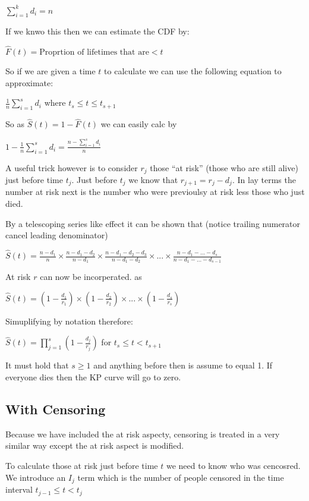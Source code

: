 \documentclass[
  letterpaper,
  DIV=11,
  numbers=noendperiod]{scrreprt}
\begin{document}
\(\sum_{i=1}^k d_i = n\)

If we knwo this then we can estimate the CDF by:

\(\hat{F}(t) = \text{Proprtion of lifetimes that are} < t\)

So if we are given a time \(t\) to calculate we can use the following
equation to approximate:

\(\frac{1}{n} \sum^{s}_{i=1}d_i\) where \(t_s\leq t \leq t_{s+1}\)

So as \(\hat{S}(t) = 1 - \hat{F}(t)\) we can easily calc by

\(1 - \frac{1}{n} \sum^{s}_{i=1}d_i = \frac{n - \sum^{s}_{i=1}d_i }{n}\)

A useful trick however is to consider \(r_j\) those ``at risk'' (those
who are still alive) just before time \(t_j\). Just before \(t_j\) we
know that \(r_{j+1} = r_j - d_j\). In lay terms the number at risk next
is the number who were previoulsy at risk less those who just died.

By a telescoping series like effect it can be shown that (notice
trailing numerator cancel leading denominator)

\(\hat{S}(t) = \frac{n-d_1}{n} \times \frac{n-d_1 - d_2}{n - d_1} \times \frac{n-d_1 - d_2- d_3}{n - d_1 - d_2} \times ... \times \frac{n - d_1 - ... - d_s}{n - d_1 - ... - d_{s-1}}\)

At risk \(r\) can now be incorperated. as

\(\hat{S}(t) = (1 - \frac{d_1}{r_1}) \times (1 - \frac{d_2}{r_2}) \times ... \times (1 - \frac{d_s}{r_s})\)

Simuplifying by notation therefore:

\(\hat{S}(t) = \prod^s_{j=1}( 1 - \frac{d_j}{r_j})\) for
\(t_s\leq t < t_{s+1}\)

It must hold that \(s\geq 1\) and anything before then is assume to
equal 1. If everyone dies then the KP curve will go to zero.

\hypertarget{with-censoring}{%
\subsection{With Censoring}\label{with-censoring}}

Because we have included the at risk aspecty, censoring is treated in a
very similar way except the at risk aspect is modified.

To calculate those at risk just before time \(t\) we need to know who
was cencosred. We introduce an \(I_j\) term which is the number of
people censored in the time interval \(t_{j-1} \leq t < t_j\)
\end{document}
